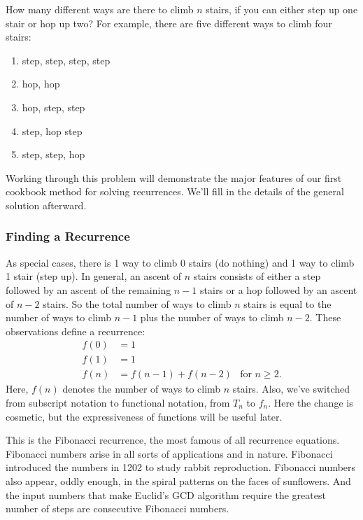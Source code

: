How many different ways are there to climb $n$ stairs, if you can
either step up one stair or hop up two?  For example, there are five
different ways to climb four stairs:
\begin{enumerate}
\item step, step, step, step
\item hop, hop
\item hop, step, step
\item step, hop step
\item step, step, hop
\end{enumerate}

\noindent Working through this problem will demonstrate the major
features of our first cookbook method for solving recurrences.  We'll
fill in the details of the general solution afterward.

\subsubsection{Finding a Recurrence}

As special cases, there is 1 way to climb 0 stairs (do nothing) and 1
way to climb 1 stair (step up).  In general, an ascent of $n$ stairs
consists of either a step followed by an ascent of the remaining $n -
1$ stairs or a hop followed by an ascent of $n - 2$ stairs.  So the
total number of ways to climb $n$ stairs is equal to the number of
ways to climb $n-1$ plus the number of ways to climb $n-2$.  These
observations define a recurrence:
\begin{align*}
f(0) & = 1 \\
f(1) & = 1 \\
f(n) & = f(n-1) + f(n-2) &\text{for $n \geq 2$}.
\end{align*}
Here, $f(n)$ denotes the number of ways to climb $n$ stairs.  Also,
we've switched from subscript notation to functional notation, from
$T_n$ to $f_n$.  Here the change is cosmetic, but the expressiveness
of functions will be useful later.

This is the Fibonacci%
 recurrence, the most famous of all
recurrence equations.  Fibonacci numbers arise in all sorts of
applications and in nature.  Fibonacci introduced the numbers in 1202
to study rabbit reproduction.  Fibonacci numbers also appear, oddly
enough, in the spiral patterns on the faces of sunflowers.  And the
input numbers that make Euclid's GCD algorithm require the greatest
number of steps are consecutive Fibonacci numbers.

